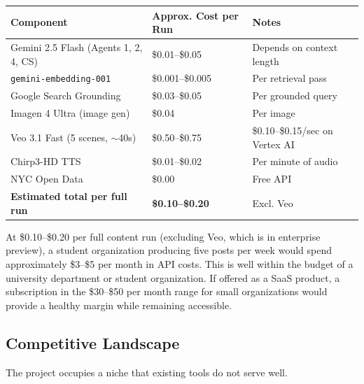 \documentclass[12pt, letterpaper]{article}
\begin{document}
\begin{center}
\begin{tabularx}{\textwidth}{Xll}
\toprule
\textbf{Component} & \textbf{Approx. Cost per Run} & \textbf{Notes} \\
\midrule
Gemini 2.5 Flash (Agents 1, 2, 4, CS) & \$0.01--\$0.05 & Depends on context length \\
\texttt{gemini-embedding-001}          & \$0.001--\$0.005 & Per retrieval pass \\
Google Search Grounding               & \$0.03--\$0.05 & Per grounded query \\
Imagen 4 Ultra (image gen)            & \$0.04 & Per image \\
Veo 3.1 Fast (5 scenes, $\sim$40s)    & \$0.50--\$0.75 & \$0.10--\$0.15/sec on Vertex AI \\
Chirp3-HD TTS                         & \$0.01--\$0.02 & Per minute of audio \\
NYC Open Data                         & \$0.00 & Free API \\
\midrule
\textbf{Estimated total per full run} & \textbf{\$0.10--\$0.20} & Excl. Veo \\
\bottomrule
\end{tabularx}
\end{center}

At \$0.10--\$0.20 per full content run (excluding Veo, which is in enterprise preview),
a student organization producing five posts per week would spend approximately
\$3--\$5 per month in API costs. This is well within the budget of a university
department or student organization. If offered as a SaaS product, a subscription in
the \$30--\$50 per month range for small organizations would provide a healthy margin
while remaining accessible.

\subsection{Competitive Landscape}

The project occupies a niche that existing tools do not serve well.
\end{document}
